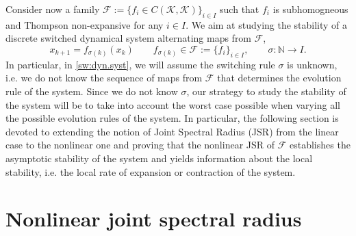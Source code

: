 \documentclass{article}
\newcommand{\N}{\mathbb{N}}
\newcommand{\family}{\mathcal{F}}
\newcommand{\cone}{\mathcal{K}}
\begin{document}
Consider now a family $\family:=\{f_i\in C(\cone,\cone)\}_{i\in I}$ such that $f_i$ is subhomogneous and Thompson non-expansive for any $i\in I$. We aim at studying the stability of a discrete switched dynamical system alternating maps from $\family$, 
%
\begin{equation}\label{sw:dyn.syst}
    x_{k+1}=f_{\sigma(k)}(x_k) \qquad  f_{\sigma(k)}\in \family:=\{f_i\}_{i\in I}, \qquad \sigma: \N\rightarrow I.
\end{equation}
%
In particular, in \eqref{sw:dyn.syst}, we will assume the switching rule $\sigma$ is unknown, i.e. we do not know the sequence of maps from $\family$ that determines the evolution rule of the system.
%
%
Since we do not know $\sigma$, our strategy to study the stability of the system will be to take into account the worst case possible when varying all the possible evolution rules of the system. In particular, the following section is devoted to extending the notion of Joint Spectral Radius (JSR) from the linear case \cite{jungers2009joint} to the nonlinear one and proving that the nonlinear JSR of $\family$ establishes the asymptotic stability of the system and yields information about the local stability, i.e. the local rate of expansion or contraction of the system. 
%






\section{Nonlinear joint spectral radius}
\label{SEC:JSR and the stability}
\end{document}
